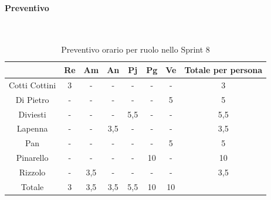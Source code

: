 \documentclass{article}
\begin{document}
                \paragraph{Preventivo}\mbox{}\\
                \begin{table}[H]
                    \centering
                    \begin{tabular}{|c|c|c|c|c|c|c|c|}
                    \hline
                                  & Re  & Am  & An  & Pj  & Pg  & Ve  & Totale per persona \\ \hline
                    Cotti Cottini & 3   & -   & -   & -   & -   & -   & 3                  \\ \hline
                    Di Pietro     & -   & -   & -   & -   & -   & 5   & 5                  \\ \hline
                    Diviesti      & -   & -   & -   & 5,5 & -   & -   & 5,5                \\ \hline
                    Lapenna       & -   & -   & 3,5 & -   & -   & -   & 3,5                \\ \hline
                    Pan           & -   & -   & -   & -   & -   & 5   & 5                  \\ \hline
                    Pinarello     & -   & -   & -   & -   & 10  & -   & 10                 \\ \hline
                    Rizzolo       & -   & 3,5 & -   & -   & -   & -   & 3,5                \\ \hline
                    Totale        & 3   & 3,5 & 3,5 & 5,5 & 10  & 10  &                    \\ \hline
                    \end{tabular}
                    \caption{Preventivo orario per ruolo nello Sprint 8}
                \end{table}

\end{document}
